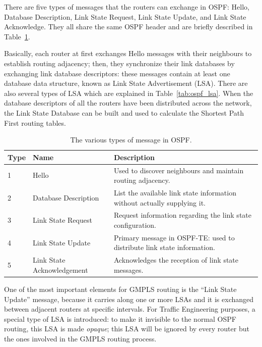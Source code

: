 \documentclass[10pt,a4paper]{report}
\begin{document}
There are five types of messages that the routers can exchange in
OSPF: Hello, Database Description, Link State Request, Link State
Update, and Link State Acknowledge. They all share the same OSPF
header and are briefly described in Table~\ref{tab:ospf_messages}.

Basically, each router at first exchanges Hello messages with their
neighbours to establish routing adjacency; then, they synchronize
their link databases by exchanging link database descriptors: these
messages contain at least one database data structure, known as Link
State Advertisement (LSA). There are also several types of LSA which
are explained in Table~\ref{tab:ospf_lsa}. When the database
descriptors of all the routers have been distributed across the
network, the Link State Database can be built and used to calculate
the Shortest Path First routing tables.

\begin{table}[!tbp]
  \begin{center}
    \begin{tabular}{|l|l|p{}|}
      \hline
      Type & Name & Description \\ \hline
      1 & Hello & Used to discover neighbours and maintain routing
      adjacency. \\
      2 & Database Description & List the available link state
      information without actually supplying it. \\
      3 & Link State Request & Request information regarding the link
      state configuration. \\
      4 & Link State Update & Primary message in OSPF-TE: used to
      distribute link state information. \\
      5 & Link State Acknowledgement & Acknowledges the reception of
      link state messages. \\
      \hline
    \end{tabular}
    \caption[OSPF messages]{The various types of message in OSPF.}
    \label{tab:ospf_messages}
  \end{center}
\end{table}

One of the most important elements for GMPLS routing is the ``Link
State Update'' message, because it carries along one or more LSAs and
it is exchanged between adjacent routers at specific intervals. For
Traffic Engineering purposes, a special type of LSA is introduced: to
make it invisible to the normal OSPF routing, this LSA is made
\textit{opaque}; this LSA will be ignored by every router but the ones
involved in the GMPLS routing process.
\end{document}
